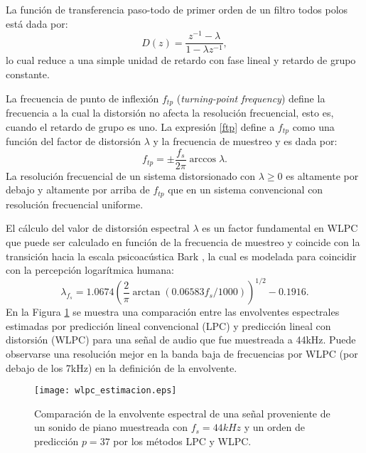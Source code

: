 La función de transferencia paso-todo de primer orden de un filtro todos polos está dada por:
\begin{equation}\label{allPass}
	D(z) = \frac{z^{-1}-\lambda}{1-\lambda z^{-1}},
\end{equation}
lo cual reduce a una simple unidad de retardo con fase lineal y retardo de grupo constante.

La frecuencia de punto de inflexión $f_{tp}$ (\emph{turning-point frequency}) define la frecuencia a la cual la distorsión no afecta la resolución frecuencial, esto es, cuando el retardo de grupo es uno. La expresión \eqref{ftp} define a $f_{tp}$ como una función del factor de distorsión $\lambda$ y la frecuencia de muestreo y es dada por:
\begin{equation}\label{ftp}
	f_{tp} = \pm \frac{f_{s}}{2 \pi} \arccos{\lambda}.
\end{equation}
La resolución frecuencial de un sistema distorsionado con $\lambda \geq 0$ es altamente por debajo y altamente por arriba de $f_{tp}$ que en un sistema convencional con resolución frecuencial uniforme.

El cálculo del valor de distorsión espectral $\lambda$ es un factor fundamental en WLPC que puede ser calculado en función de la frecuencia de muestreo y coincide con la transición hacia la escala psicoacústica Bark \cite[]{Smith1999}, la cual es modelada para coincidir con la percepción logarítmica humana:
\begin{equation}
	\lambda_{f_{s}} = 1.0674\left( \frac{2}{\pi} \arctan(0.06583 f_{s}/1000) \right)^{1/2} -0.1916.
\end{equation}
 En la Figura \ref{wlpcAprox} se muestra una comparación entre las envolventes espectrales estimadas por  predicción lineal convencional (LPC) y predicción lineal con distorsión (WLPC) para una señal de audio que fue muestreada a 44kHz. Puede observarse una resolución mejor en la banda baja de frecuencias por WLPC (por debajo de los 7kHz) en la definición de la envolvente.
\begin{figure}[ht]
  \centering
  \texttt{[image: wlpc\_estimacion.eps]}
  \caption{Comparación de la envolvente espectral de una señal proveniente de un sonido de piano muestreada con $f_{s} = 44kHz$ y un orden de predicción $p=37$ por los métodos LPC y WLPC.}
  \label{wlpcAprox}
\end{figure}
